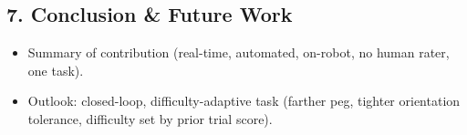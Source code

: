 \documentclass[11pt]{article}
\begin{document}
\subsection*{7. Conclusion \& Future Work}
\begin{itemize}
  \item Summary of contribution (real-time, automated, on-robot,
  no human rater, one task).
  \item Outlook: closed-loop, difficulty-adaptive task (farther peg,
  tighter orientation tolerance, difficulty set by prior trial score).
\end{itemize}



\end{document}
